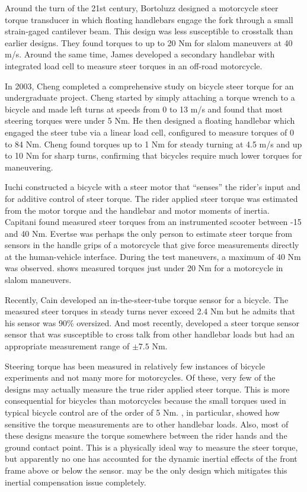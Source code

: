 \documentclass[a4paper]{article}
\begin{document}
Around the turn of the 21st century, Bortoluzz \cite{Bortoluzzi2000} designed a motorcycle
steer torque transducer in which floating handlebars engage the fork through a
small strain-gaged cantilever beam. This design was less susceptible to
crosstalk than earlier designs. They found torques to up to 20 Nm for slalom
maneuvers at 40 m/s. Around the same time, James \cite{James2002} developed a
secondary handlebar with integrated load cell to measure steer torques in an
off-road motorcycle.

In 2003, Cheng \cite{Cheng2003} completed a comprehensive study on bicycle steer
torque for an undergraduate project. Cheng started by simply attaching a torque
wrench to a bicycle and made left turns at speeds from 0 to 13 m/s and found
that most steering torques were under 5 Nm. He then designed a floating
handlebar which engaged the steer tube via a linear load cell,
configured to measure torques of 0 to 84 Nm. Cheng found torques up to 1 Nm
for steady turning at 4.5 m/s and up to 10 Nm for sharp turns, confirming that
bicycles require much lower torques for maneuvering.

Iuchi \cite{Iuchi2006} constructed a bicycle with a steer motor that ``senses'' the
rider's input and for additive control of steer torque. The rider applied steer
torque was estimated from the motor torque and the handlebar and motor moments
of inertia. Capitani \cite{Capitani2006} found measured steer torques from an
instrumented scooter between -15 and 40 Nm. Evertse \cite{Evertse2010} was perhaps the only
person to estimate steer torque from sensors in the handle grips of a
motorcycle that give force measurements directly at the human-vehicle
interface. During the test maneuvers, a maximum of 40 Nm was observed.
\cite{Teerhuis2010} shows measured torques just under 20 Nm for a motorcycle in
slalom maneuvers.

Recently, Cain \cite{Cain2012} developed an in-the-steer-tube torque sensor for a
bicycle. The measured steer torques in steady turns never exceed 2.4 Nm but he
admits that his sensor was 90\% oversized. And most recently, \cite{Ouden2011}
developed a steer torque sensor sensor that was susceptible to cross talk from
other handlebar loads but had an appropriate measurement range of $\pm7.5$ Nm.

Steering torque has been measured in relatively few instances of bicycle
experiments and not many more for motorcycles. Of these, very few of the
designs may actually measure the true rider applied steer torque. This is more
consequential for bicycles than motorcycles because the small torques used in
typical bicycle control are of the order of 5 Nm. \cite{Ouden2011}, in
particular, showed how sensitive the torque measurements are to other handlebar
loads. Also, most of these designs measure the torque somewhere between the
rider hands and the ground contact point. This is a physically ideal way to
measure the steer torque, but apparently no one has accounted for the dynamic inertial
effects of the front frame above or below the sensor. \cite{Evertse2010} may be
the only design which mitigates this inertial compensation issue completely.
\end{document}

